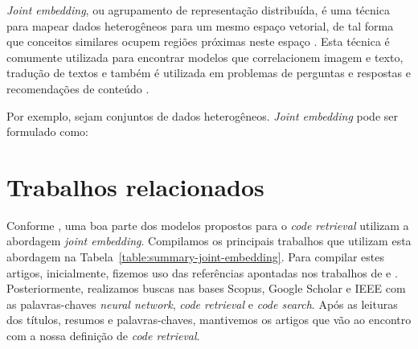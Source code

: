 \textit{Joint embedding}, ou agrupamento de representação distribuída, é uma técnica para mapear dados heterogêneos para um mesmo espaço vetorial, de tal forma que conceitos similares ocupem regiões próximas neste espaço \citep{Gu-deep-code-search:2018}. Esta técnica é comumente utilizada para encontrar modelos que correlacionem imagem e texto, tradução de textos e também é utilizada em problemas de perguntas e respostas e recomendações de conteúdo \citep{lai-etal-2018-review, Zhang:2019:deep-learning-recommender-survey}.

Por exemplo, sejam  conjuntos de dados heterogêneos. \textit{Joint embedding} pode ser formulado como:



    

\section{Trabalhos relacionados}\label{sec:code-retrieval-trabalhos-relacionados}

Conforme \cite{cambronero-deep-learning-code-search:2019}, uma boa parte dos modelos propostos para o \textit{code retrieval} utilizam a abordagem \textit{joint embedding}. Compilamos os principais trabalhos que utilizam esta abordagem na Tabela~\ref{table:summary-joint-embedding}. Para compilar estes artigos, inicialmente, fizemos uso das referências apontadas nos  trabalhos de \citeauthor{Allamanis:2018:SML} e \citeauthor{yao-2018}. Posteriormente, realizamos buscas nas bases Scopus, Google Scholar e IEEE com as palavras-chaves \textit{neural network}, \textit{code retrieval} e \textit{code search}. Após as leituras dos títulos, resumos e palavras-chaves, mantivemos os artigos que vão ao encontro com a nossa definição de \textit{code retrieval}.

